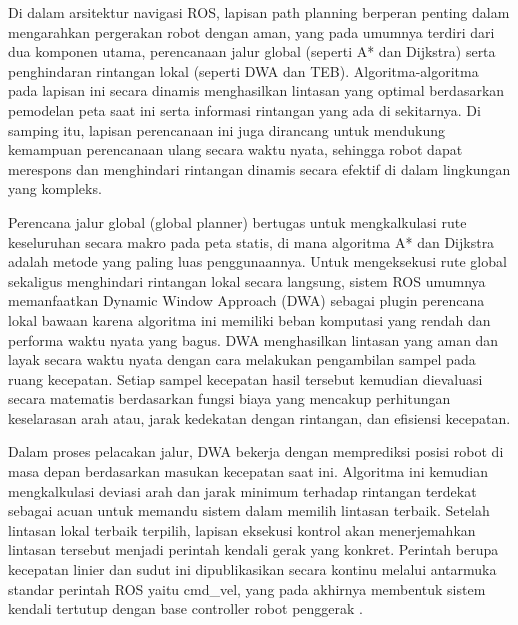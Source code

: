 Di dalam arsitektur navigasi ROS, lapisan path planning berperan penting dalam mengarahkan pergerakan robot dengan aman, yang pada umumnya terdiri dari dua komponen utama, perencanaan jalur global (seperti A* dan Dijkstra) serta penghindaran rintangan lokal (seperti DWA dan TEB). Algoritma-algoritma pada lapisan ini secara dinamis menghasilkan lintasan yang optimal berdasarkan pemodelan peta saat ini serta informasi rintangan yang ada di sekitarnya. Di samping itu, lapisan perencanaan ini juga dirancang untuk mendukung kemampuan perencanaan ulang secara waktu nyata, sehingga robot dapat merespons dan menghindari rintangan dinamis secara efektif di dalam lingkungan yang kompleks.

Perencana jalur global (global planner) bertugas untuk mengkalkulasi rute keseluruhan secara makro pada peta statis, di mana algoritma A* dan Dijkstra adalah metode yang paling luas penggunaannya. Untuk mengeksekusi rute global sekaligus menghindari rintangan lokal secara langsung, sistem ROS umumnya memanfaatkan Dynamic Window Approach (DWA) sebagai plugin perencana lokal bawaan karena algoritma ini memiliki beban komputasi yang rendah dan performa waktu nyata yang bagus. DWA menghasilkan lintasan yang aman dan layak secara waktu nyata dengan cara melakukan pengambilan sampel pada ruang kecepatan. Setiap sampel kecepatan hasil tersebut kemudian dievaluasi secara matematis berdasarkan fungsi biaya yang mencakup perhitungan keselarasan arah atau, jarak kedekatan dengan rintangan, dan efisiensi kecepatan.

Dalam proses pelacakan jalur, DWA bekerja dengan memprediksi posisi robot di masa depan berdasarkan masukan kecepatan saat ini. Algoritma ini kemudian mengkalkulasi deviasi arah dan jarak minimum terhadap rintangan terdekat sebagai acuan untuk memandu sistem dalam memilih lintasan terbaik. Setelah lintasan lokal terbaik terpilih, lapisan eksekusi kontrol akan menerjemahkan lintasan tersebut menjadi perintah kendali gerak yang konkret. Perintah berupa kecepatan linier dan sudut ini dipublikasikan secara kontinu melalui antarmuka standar perintah ROS yaitu cmd\_vel, yang pada akhirnya membentuk sistem kendali tertutup dengan base controller robot penggerak \parencite{wei2025ROS}.


